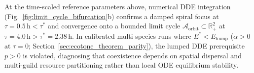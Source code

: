 \begin{remark}
At the time-scaled reference parameters above, numerical DDE integration (Fig.~\ref{fig:limit_cycle_bifurcation}b) confirms a damped spiral focus at $\tau = 0.5\,\mathrm{h} < \tau^*$ and convergence onto a bounded limit cycle $\mathcal{A}_{\mathrm{orbit}} \subset \mathbb{R}_+^2$ at $\tau = 4.0\,\mathrm{h} > \tau^* = 2.38\,\mathrm{h}$. In calibrated multi-species runs where $E^* < E_{\mathrm{hump}}$ ($\alpha > 0$ at $\tau = 0$; Section~\ref{sec:ecotone_theorem_parity}), the lumped DDE prerequisite $p > 0$ is violated, diagnosing that coexistence depends on spatial dispersal and multi-guild resource partitioning rather than local ODE equilibrium stability.
\end{remark}
